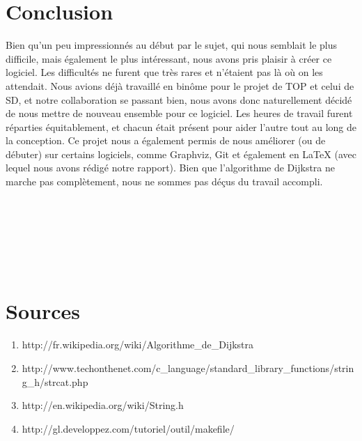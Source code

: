 \documentclass[12pt,a4paper]{report}
\begin{document}
\section{Conclusion}
Bien qu'un peu impressionnés au début par le sujet, qui nous semblait le plus difficile, mais également le plus intéressant, nous avons pris plaisir à créer ce logiciel. Les difficultés ne furent que très rares et n'étaient pas là où on les attendait. Nous avions déjà travaillé en binôme pour le projet de TOP et celui de SD, et notre collaboration se passant bien, nous avons donc naturellement décidé de nous mettre de nouveau ensemble pour ce logiciel. Les heures de travail furent réparties équitablement, et chacun était présent pour aider l'autre tout au long de la conception. Ce projet nous a également permis de nous améliorer (ou de débuter) sur certains logiciels, comme Graphviz, Git et également en LaTeX (avec lequel nous avons rédigé notre rapport). Bien que l'algorithme de Dijkstra ne marche pas complètement, nous ne sommes pas déçus du travail accompli.
\\
\\
\\
\\
\\
\\
\\
\pagebreak

\section{Sources}
\begin{enumerate}
\item http://fr.wikipedia.org/wiki/Algorithme_de_Dijkstra
\item http://www.techonthenet.com/c_language/standard_library_functions/string_h/strcat.php
\item http://en.wikipedia.org/wiki/String.h
\item http://gl.developpez.com/tutoriel/outil/makefile/
\end{enumerate}
\end{document}

